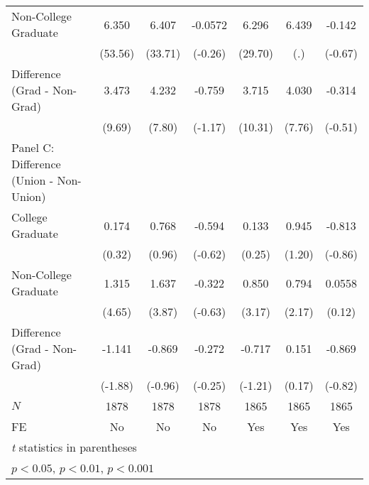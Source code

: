 \begin{table}[htbp]
\begin{tabular}{l*{6}{c}}
Non-College Graduate&       6.350\sym{***}&       6.407\sym{***}&     -0.0572         &       6.296\sym{***}&       6.439         &      -0.142         \\
            &     (53.56)         &     (33.71)         &     (-0.26)         &     (29.70)         &         (.)         &     (-0.67)         \\
Difference (Grad - Non-Grad)&       3.473\sym{***}&       4.232\sym{***}&      -0.759         &       3.715\sym{***}&       4.030\sym{***}&      -0.314         \\
            &      (9.69)         &      (7.80)         &     (-1.17)         &     (10.31)         &      (7.76)         &     (-0.51)         \\
\midrule
Panel C: Difference (Union - Non-Union)&                     &                     &                     &                     &                     &                     \\
College Graduate&       0.174         &       0.768         &      -0.594         &       0.133         &       0.945         &      -0.813         \\
            &      (0.32)         &      (0.96)         &     (-0.62)         &      (0.25)         &      (1.20)         &     (-0.86)         \\
Non-College Graduate&       1.315\sym{***}&       1.637\sym{***}&      -0.322         &       0.850\sym{**} &       0.794\sym{*}  &      0.0558         \\
            &      (4.65)         &      (3.87)         &     (-0.63)         &      (3.17)         &      (2.17)         &      (0.12)         \\
Difference (Grad - Non-Grad)&      -1.141         &      -0.869         &      -0.272         &      -0.717         &       0.151         &      -0.869         \\
            &     (-1.88)         &     (-0.96)         &     (-0.25)         &     (-1.21)         &      (0.17)         &     (-0.82)         \\
\midrule
\(N\)       &        1878         &        1878         &        1878         &        1865         &        1865         &        1865         \\
FE          &          No         &          No         &          No         &         Yes         &         Yes         &         Yes         \\
\bottomrule
\multicolumn{7}{l}{\footnotesize \textit{t} statistics in parentheses}\\
\multicolumn{7}{l}{\footnotesize \sym{*} \(p<0.05\), \sym{**} \(p<0.01\), \sym{***} \(p<0.001\)}\\
\end{tabular}
\end{table}

